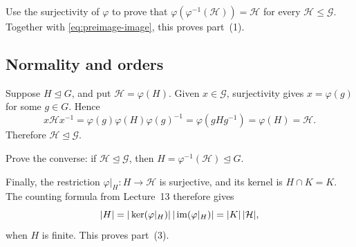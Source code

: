 \documentclass[reqno,11pt]{amsart}
\begin{document}
\begin{exercise}
Use the surjectivity of $\varphi$ to prove that
$\varphi(\varphi^{-1}(\mathcal H))=\mathcal H$ for every
$\mathcal H\leq\mathcal G$. Together with
\eqref{eq:preimage-image}, this proves part~(1).
\end{exercise}

\subsection{Normality and orders}

Suppose $H\trianglelefteq G$, and put $\mathcal H=\varphi(H)$.
Given $x\in\mathcal G$, surjectivity gives $x=\varphi(g)$ for some
$g\in G$. Hence
\[
  x\mathcal Hx^{-1}
  =\varphi(g)\varphi(H)\varphi(g)^{-1}
  =\varphi(gHg^{-1})
  =\varphi(H)=\mathcal H.
\]
Therefore $\mathcal H\trianglelefteq\mathcal G$.

\begin{exercise}
Prove the converse: if $\mathcal H\trianglelefteq\mathcal G$, then
$H=\varphi^{-1}(\mathcal H)\trianglelefteq G$.
\end{exercise}

Finally, the restriction $\varphi|_H:H\to\mathcal H$ is surjective,
and its kernel is $H\cap K=K$. The counting formula from Lecture~13
therefore gives
\[
  |H|=|\ker(\varphi|_H)|\,|\operatorname{im}(\varphi|_H)|=|K|\,|\mathcal H|,
\]
when $H$ is finite. This proves part~(3).
\end{document}
